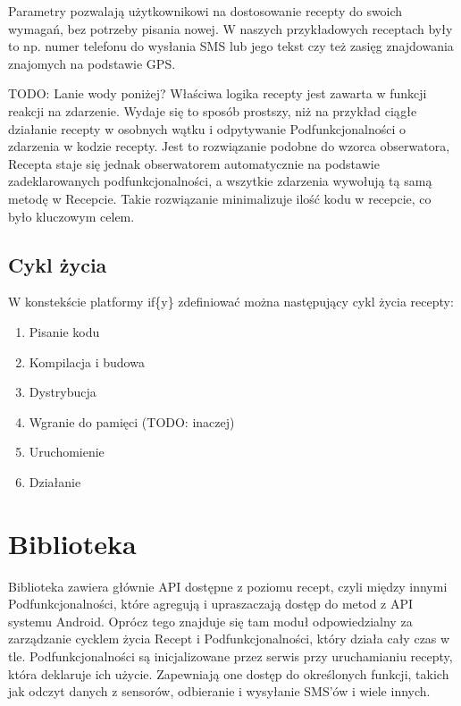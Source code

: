 \documentclass[11pt,a4paper,polish,thesis]{dcsbook}
\begin{document}
Parametry pozwalają użytkownikowi na dostosowanie recepty do swoich wymagań, bez potrzeby pisania nowej. W naszych przykładowych receptach były to np. numer telefonu do wysłania SMS lub jego tekst czy też zasięg znajdowania znajomych na podstawie GPS.


TODO: Lanie wody poniżej?
Właściwa logika recepty jest zawarta w funkcji reakcji na zdarzenie. Wydaje się to sposób prostszy, niż na przykład ciągłe działanie recepty w osobnych wątku i odpytywanie Podfunkcjonalności o zdarzenia w kodzie recepty. Jest to rozwiązanie podobne do wzorca obserwatora, Recepta staje się jednak obserwatorem automatycznie na podstawie zadeklarowanych podfunkcjonalności, a wszytkie zdarzenia wywołują tą samą metodę w Recepcie. Takie rozwiązanie minimalizuje ilość kodu w recepcie, co było kluczowym celem.

\subsection{Cykl życia}
W konstekście platformy if\{y\} zdefiniować można następujący cykl życia recepty:
\begin{enumerate}
\item Pisanie kodu
\item Kompilacja i budowa
\item Dystrybucja
\item Wgranie do pamięci (TODO: inaczej)
\item Uruchomienie
\item Działanie
\end{enumerate}

\section{Biblioteka}
Biblioteka zawiera głównie API dostępne z poziomu recept, czyli między innymi Podfunkcjonalności, które agregują i upraszaczają dostęp do metod z API systemu Android. Oprócz tego znajduje się tam moduł odpowiedzialny za zarządzanie cycklem życia Recept i Podfunkcjonalności, który działa cały czas w tle. Podfunkcjonalności są inicjalizowane przez serwis przy uruchamianiu recepty, która deklaruje ich użycie. Zapewniają one dostęp do określonych funkcji, takich jak odczyt danych z sensorów, odbieranie i wysyłanie SMS'ów i wiele innych.
\end{document}
